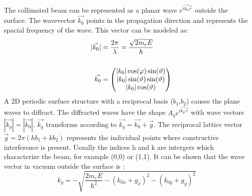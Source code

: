 \noindent The collimated beam can be represented as a planar wave $e^{i \vec{k_0} \vec{r}}$  outside the surface.
The wavevector $\vec{k_0}$ points in the propagation direction and represents the spacial frequency of the wave.
This vector can be modeled as:
\begin{align}
    |\vec{k_0}| &= \frac{2 \pi}{\lambda} = \frac{\sqrt{2 m_e E}}{\hbar} \\
    \hspace{1cm} \notag \\
    \vec{k_0} &= \begin{pmatrix}
        |k_0|\cos(\varphi)\sin(\vartheta)\\|k_0|\sin(\vartheta)\sin(\vartheta)\\|k_0| \cos(\vartheta)
    \end{pmatrix}
\end{align}
A 2D periodic surfuce structure with a reciprocal basis ($b_1$,$b_2$) causes the plane waves to diffract.
The diffracted waves have the shape $A_g e^{i \vec{k_g} \vec{r}}$ with wave vectors $|\vec{k_g}| = |\vec{k_0}|$.
$\vec{k_g}$ transforms according to $\vec{k_g} = \vec{k_0} + \vec{g}$. 
The reciprocal lattice vector $\vec{g} = 2 \pi ( h b_1 + k b_2)$ represents the individual points where constructive interference is present.
Usually the indices h and k are intergers which characterize the beam, for example (0,0) or (1,1).
It can be shown that the wave vector in vacuum outside the surface is \cite{MoritzWolfgang2022SSDb}:
\begin{equation}
    k_g = - \sqrt{\frac{2 m_e E}{\hbar^2} - (k_{0x}+ g_{x})^2 - (k_{0y}+ g_{y})^2}
\end{equation}

